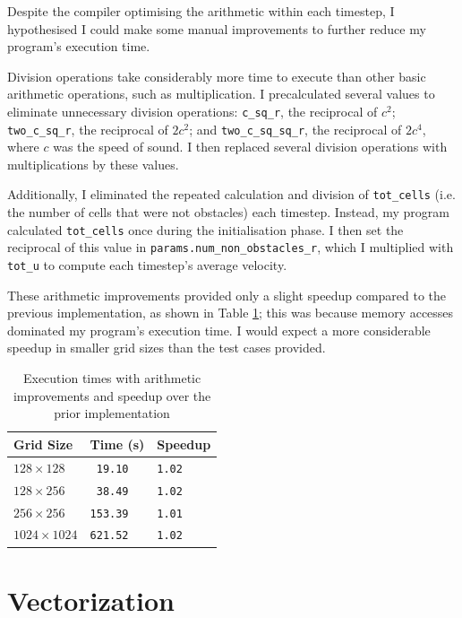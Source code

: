 \documentclass[twocolumn, a4paper]{article}
\begin{document}
Despite the compiler optimising the arithmetic within each timestep, I hypothesised I could make some manual improvements to further reduce my program's execution time.

Division operations take considerably more time to execute than other basic arithmetic operations, such as multiplication.
I precalculated several values to eliminate unnecessary division operations: \texttt{c\_sq\_r}, the reciprocal of $c^2$; \texttt{two\_c\_sq\_r}, the reciprocal of $2c^2$; and \texttt{two\_c\_sq\_sq\_r}, the reciprocal of $2c^4$, where $c$ was the speed of sound.
I then replaced several division operations with multiplications by these values.

Additionally, I eliminated the repeated calculation and division of \texttt{tot\_cells} (i.e. the number of cells that were not obstacles) each timestep.
Instead, my program calculated \texttt{tot\_cells} once during the initialisation phase.
I then set the reciprocal of this value in \texttt{params.num\_non\_obstacles\_r}, which I multiplied with \texttt{tot\_u} to compute each timestep's average velocity.

These arithmetic improvements provided only a slight speedup compared to the previous implementation, as shown in Table \ref{tab:arithmetic_improvements}; this was because memory accesses dominated my program's execution time.
I would expect a more considerable speedup in smaller grid sizes than the test cases provided.

\begin{table}[htbp]
  \begin{center}
  \caption{Execution times with arithmetic improvements and speedup over the prior implementation}\label{tab:arithmetic_improvements}
  \begin{tabular}[t]{l | l l} 
      \hline\hline
      Grid Size&Time (s)&Speedup\\
      \hline
      $128 \times 128$&\texttt{ 19.10}&\texttt{1.02}\\
      $128 \times 256$&\texttt{ 38.49}&\texttt{1.02}\\
      $256 \times 256$&\texttt{153.39}&\texttt{1.01}\\
      $1024 \times 1024$&\texttt{621.52}&\texttt{1.02}\\
      \hline
    \end{tabular}
  \end{center}
\end{table}

\section{Vectorization}
\end{document}
